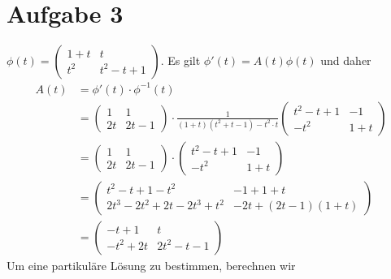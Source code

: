\documentclass{article}
\theoremstyle{definition}
\begin{document}
\section*{Aufgabe 3}
$\phi(t) = \begin{pmatrix}
	1+ t & t\\
	t^2 & t ^2 - t + 1
\end{pmatrix}$.
Es gilt $\phi'(t) = A(t)\phi(t)$ und daher
\begin{align*}
	A(t) &= \phi'(t)\cdot \phi^{-1}(t)\\
	&= \begin{pmatrix}
		1 & 1\\
		2t & 2t -1
	\end{pmatrix} \cdot \frac{1}{(1+t)(t^2 + t - 1) - t^2\cdot t} \begin{pmatrix}
		t^2 - t + 1 & -1\\
		-t^2 & 1 + t
	\end{pmatrix}\\
	&= \begin{pmatrix}
		1 & 1\\
		2t & 2t -1
	\end{pmatrix} \cdot \begin{pmatrix}
		t^2 - t + 1 & -1\\
		-t^2 & 1 + t
	\end{pmatrix}\\
	&= \begin{pmatrix}
		t^2  - t + 1 - t^2 & -1 + 1 + t\\
		2t^3 - 2t^2 + 2t - 2t^3 + t^2& -2t + (2t-1)(1+t)
	\end{pmatrix}\\
	&= \begin{pmatrix}
		-t + 1 & t\\
		-t^2 + 2t & 2t^2 - t -1
	\end{pmatrix}
\end{align*}
Um eine partikuläre Lösung zu bestimmen, berechnen wir 
\end{document}
